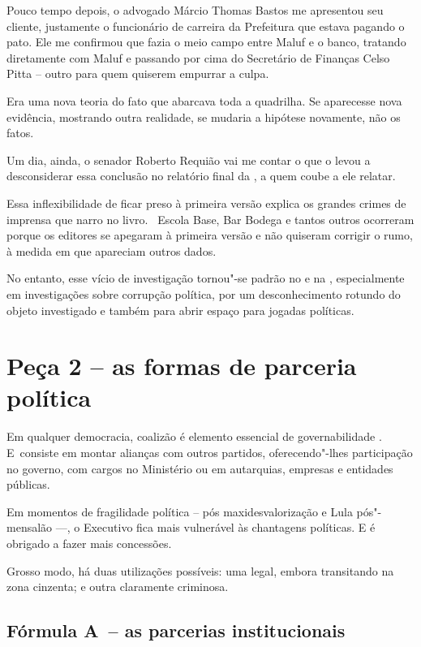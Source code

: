 Pouco tempo depois, o advogado Márcio Thomas Bastos me apresentou seu
cliente, justamente o funcionário de carreira da Prefeitura que estava
pagando o pato. Ele me confirmou que fazia o meio campo entre Maluf e o
banco, tratando diretamente com Maluf e passando por cima do Secretário
de Finanças Celso Pitta -- outro para quem quiserem empurrar a culpa.

Era uma nova teoria do fato que abarcava toda a quadrilha. Se aparecesse
nova evidência, mostrando outra realidade, se mudaria a hipótese
novamente, não os fatos.

Um dia, ainda, o senador Roberto Requião vai me contar o que o levou a
desconsiderar essa conclusão no relatório final da , a quem coube a
ele relatar.

Essa inflexibilidade de ficar preso à primeira versão explica os grandes
crimes de imprensa que narro no livro. ~Escola Base, Bar Bodega e tantos
outros ocorreram porque os editores se apegaram à primeira versão e não
quiseram corrigir o rumo, à medida em que apareciam outros dados.

No entanto, esse vício de investigação tornou"-se padrão no  e na ,
especialmente em investigações sobre corrupção política, por um
desconhecimento rotundo do objeto investigado e também para abrir espaço
para jogadas políticas.

\section{Peça 2 -- as formas de parceria política}

Em qualquer democracia, coalizão é elemento essencial de governabilidade
. E~consiste em montar alianças com outros partidos, oferecendo"-lhes
participação no governo, com cargos no Ministério ou em autarquias,
empresas e entidades públicas.

Em momentos de fragilidade política --  pós maxidesvalorização e Lula
pós"-mensalão \mbox{---,} o Executivo fica mais vulnerável às chantagens
políticas. E é obrigado a fazer mais concessões.

Grosso modo, há duas utilizações possíveis: uma legal, embora
transitando na zona cinzenta; e outra claramente criminosa.

\subsection{\textbf{Fórmula A}~-- as parcerias institucionais}

